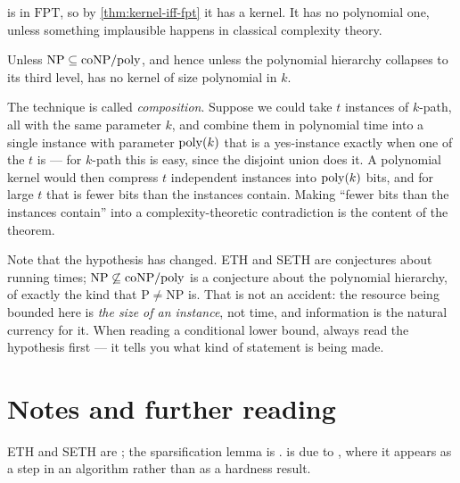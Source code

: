  is in $\mathrm{FPT}$, so by \cref{thm:kernel-iff-fpt} it has a
kernel. It has no polynomial one, unless something implausible happens in
classical complexity theory.

\begin{theorem}
\label{thm:no-poly-kernel}
Unless $\mathrm{NP} \subseteq \mathrm{coNP}/\mathrm{poly}$, and hence unless the
polynomial hierarchy collapses to its third level,  has no
kernel of size polynomial in $k$.
\end{theorem}

The technique is called \emph{composition}. Suppose we could take $t$ instances
of $k$-path, all with the same parameter $k$, and combine them in polynomial
time into a single instance with parameter $\mathrm{poly}(k)$ that is a yes-instance
exactly when one of the $t$ is --- for $k$-path this is easy, since the
disjoint union does it. A polynomial kernel would then compress $t$ independent
instances into $\mathrm{poly}(k)$ bits, and for large $t$ that is fewer bits than the
instances contain. Making ``fewer bits than the instances contain'' into a
complexity-theoretic contradiction is the content of the theorem.

\begin{intuition}
Note that the hypothesis has changed. ETH and SETH are conjectures about
running times; $\mathrm{NP} \not\subseteq \mathrm{coNP}/\mathrm{poly}$ is a
conjecture about the polynomial hierarchy, of exactly the kind that
$\mathrm{P} \ne \mathrm{NP}$ is. That is not an accident: the resource being
bounded here is \emph{the size of an instance}, not time, and information is
the natural currency for it. When reading a conditional lower bound, always
read the hypothesis first --- it tells you what kind of statement is being
made.
\end{intuition}

\section{Notes and further reading}
\label{sec:lower-bounds-further-reading}

ETH and SETH are \citet{ImpagliazzoPaturi2001}; the sparsification lemma is
\citet{ImpagliazzoPaturiZane2001}.  is due to
\citet{Williams2005}, where it appears as a step in an algorithm rather than as
a hardness result.

